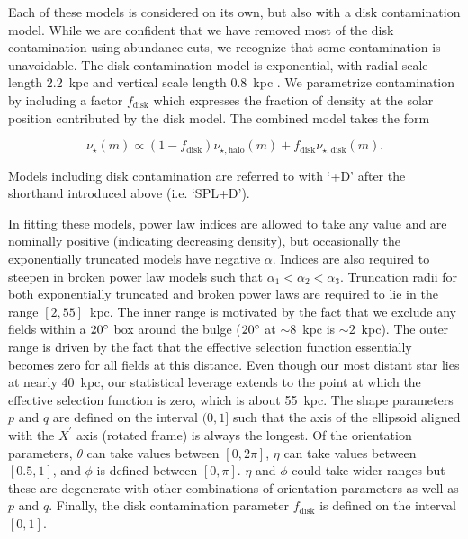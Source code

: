 Each of these models is considered on its own, but also with a disk contamination model. While we are confident that we have removed most of the disk contamination using abundance cuts, we recognize that some contamination is unavoidable. The disk contamination model is exponential, with radial scale length 2.2~kpc and vertical scale length 0.8~kpc \parencite{mackereth17}. We parametrize contamination by including a factor $f_\mathrm{disk}$ which expresses the fraction of density at the solar position contributed by the disk model. The combined model takes the form

\begin{equation}
\label{ch3:eq:disk-contamination}
\nu_{\star} (m) \propto (1-f_\mathrm{disk}) \nu_{\star,\mathrm{halo}}(m) + f_\mathrm{disk} \nu_{\star,\mathrm{disk}}(m) .
\end{equation}

\noindent Models including disk contamination are referred to with `+D' after the shorthand introduced above (i.e. `SPL+D').

In fitting these models, power law indices are allowed to take any value and are nominally positive (indicating decreasing density), but occasionally the exponentially truncated models have negative $\alpha$. Indices are also required to steepen in broken power law models such that $\alpha_{1} < \alpha_{2} < \alpha_{3}$. Truncation radii for both exponentially truncated and broken power laws are required to lie in the range $[2,55]$~kpc. The inner range is motivated by the fact that we exclude any fields within a $20\hbox{$^\circ$}$ box around the bulge ($20\hbox{$^\circ$}$ at $\sim 8$~kpc is $\sim 2$~kpc). The outer range is driven by the fact that the effective selection function essentially becomes zero for all fields at this distance. Even though our most distant star lies at nearly 40~kpc, our statistical leverage extends to the point at which the effective selection function is zero, which is about 55~kpc. The shape parameters $p$ and $q$ are defined on the interval $(0,1]$ such that the axis of the ellipsoid aligned with the $X^{\prime}$ axis (rotated frame) is always the longest. Of the orientation parameters, $\theta$ can take values between $[0,2\pi]$, $\eta$ can take values between $[0.5,1]$, and $\phi$ is defined between $[0,\pi]$. $\eta$ and $\phi$ could take wider ranges but these are degenerate with other combinations of orientation parameters as well as $p$ and $q$. Finally, the disk contamination parameter $f_\mathrm{disk}$ is defined on the interval $[0,1]$.

